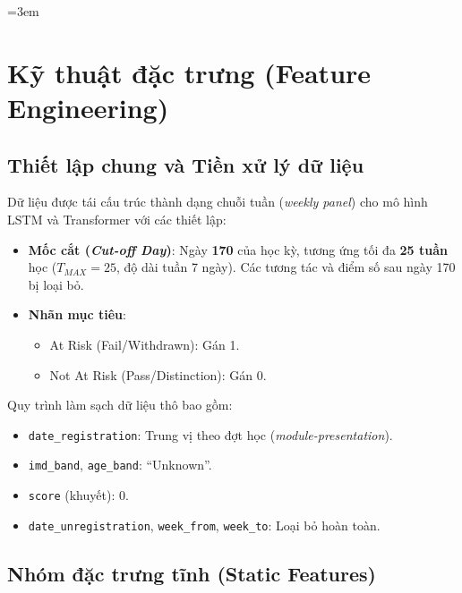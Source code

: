 \emergencystretch=3em
\begingroup
\linespread{1.15}\selectfont
\section{Kỹ thuật đặc trưng (Feature Engineering)}

\subsection{Thiết lập chung và Tiền xử lý dữ liệu}

Dữ liệu được tái cấu trúc thành dạng chuỗi tuần (\textit{weekly panel}) cho mô hình LSTM và Transformer với các thiết lập:
\begin{itemize}[noitemsep,topsep=0pt]
    \item \textbf{Mốc cắt (\textit{Cut-off Day})}: Ngày \textbf{170} của học kỳ, tương ứng tối đa \textbf{25 tuần} học ($T_{MAX} = 25$, độ dài tuần 7 ngày). Các tương tác và điểm số sau ngày 170 bị loại bỏ.
    \item \textbf{Nhãn mục tiêu}:
    \begin{itemize}[noitemsep,topsep=0pt]
        \item At Risk (Fail/Withdrawn): Gán 1.
        \item Not At Risk (Pass/Distinction): Gán 0.
    \end{itemize}
\end{itemize}

Quy trình làm sạch dữ liệu thô bao gồm:
\begin{itemize}[noitemsep,topsep=0pt]
    \item \texttt{date\_}\allowbreak\texttt{registration}: Trung vị theo đợt học (\textit{module-presentation}).
    \item \texttt{imd\_}\allowbreak\texttt{band}, \texttt{age\_}\allowbreak\texttt{band}: ``Unknown''.
    \item \texttt{score} (khuyết): 0.
    \item \texttt{date\_}\allowbreak\texttt{unregistration}, \texttt{week\_}\allowbreak\texttt{from}, \texttt{week\_}\allowbreak\texttt{to}: Loại bỏ hoàn toàn.
\end{itemize}

\subsection{Nhóm đặc trưng tĩnh (Static Features)}

